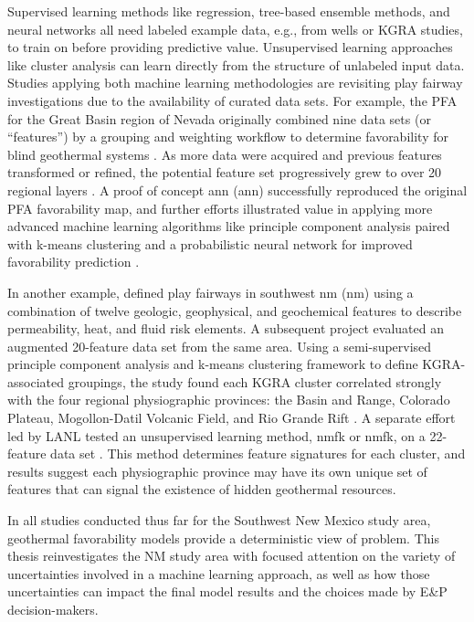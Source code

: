 Supervised learning methods like regression, tree-based ensemble methods, and neural networks all need labeled example data, e.g., from wells or KGRA studies, to train on before providing predictive value. Unsupervised learning approaches like cluster analysis can learn directly from the structure of unlabeled input data. Studies applying both machine learning methodologies are revisiting play fairway investigations due to the availability of curated data sets. For example, the PFA for the Great Basin region of Nevada originally combined nine data sets (or “features”) by a grouping and weighting workflow to determine favorability for blind geothermal systems \citep{faulds_progress_2017}. As more data were acquired and previous features transformed or refined, the potential feature set progressively grew to over 20 regional layers \citep{brown_machine_2020, faulds_discovering_2019}. A proof of concept \acrlong{ann} (\acrshort{ann}) successfully reproduced the original PFA favorability map, and further efforts illustrated value in applying more advanced machine learning algorithms like principle component analysis paired with k-means clustering \citep{smith_characterizing_2021} and a probabilistic neural network for improved favorability prediction \citep{brown_machine_2020}.

In another example, \citet{bielicki_hydrogeolgic_2015} defined play fairways in southwest \acrlong{nm} (\acrshort{nm}) using a combination of twelve geologic, geophysical, and geochemical features to describe permeability, heat, and fluid risk elements. A subsequent project evaluated an augmented 20-feature data set from the same area. Using a semi-supervised principle component analysis and k-means clustering framework to define KGRA-associated groupings, the study found each KGRA cluster correlated strongly with the four regional physiographic provinces: the Basin and Range, Colorado Plateau, Mogollon-Datil Volcanic Field, and Rio Grande Rift \citep{pepin_new_2018}. A separate effort led by LANL tested an unsupervised learning method, \acrlong{nmfk} or \acrshort{nmfk}, on a 22-feature data set \citep{vesselinov_discovering_2020}. This method determines feature signatures for each cluster, and results suggest each physiographic province may have its own unique set of features that can signal the existence of hidden geothermal resources. 

In all studies conducted thus far for the Southwest New Mexico study area, geothermal favorability models provide a deterministic view of problem. This thesis reinvestigates the NM study area with focused attention on the variety of uncertainties involved in a machine learning approach, as well as how those uncertainties can impact the final model results and the choices made by E\&P decision-makers.

